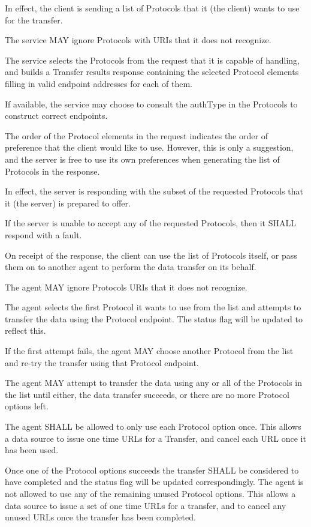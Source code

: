 \documentclass[11pt,a4paper]{ivoa}
\begin{document}
In effect, the client is sending a list of Protocols that it (the client) wants to use for the transfer.

The service MAY ignore Protocols with URIs that it does not recognize.

The service selects the Protocols from the request that it is capable of handling, and builds a Transfer results response containing the selected Protocol elements filling in valid endpoint addresses for each of them.

If available, the service may choose to consult the authType in the Protocols to construct correct endpoints.

The order of the Protocol elements in the request indicates the order of preference that the client would like to use. However, this is only a suggestion, and the server is free to use its own preferences when generating the list of Protocols in the response.

In effect, the server is responding with the subset of the requested Protocols that it (the server) is prepared to offer.

If the server is unable to accept any of the requested Protocols, then it SHALL respond with a fault.

On receipt of the response, the client can use the list of Protocols itself, or pass them on to another agent to perform the data transfer on its behalf.

The agent MAY ignore Protocols URIs that it does not recognize.

The agent selects the first Protocol it wants to use from the list and attempts to transfer the data using the Protocol endpoint. The status flag will be updated to reflect this.

If the first attempt fails, the agent MAY choose another Protocol from the list and re-try the transfer using that Protocol endpoint.

The agent MAY attempt to transfer the data using any or all of the Protocols in the list until either, the data transfer succeeds, or there are no more Protocol options left.

The agent SHALL be allowed to only use each Protocol option once. This allows a data source to issue one time URLs for a Transfer, and cancel each URL once it has been used.

Once one of the Protocol options succeeds the transfer SHALL be considered to have completed and the status flag will be updated correspondingly. The agent is not allowed to use any of the remaining unused Protocol options. This allows a data source to issue a set of one time URLs for a transfer, and to cancel any unused URLs once the transfer has been completed.
\end{document}
